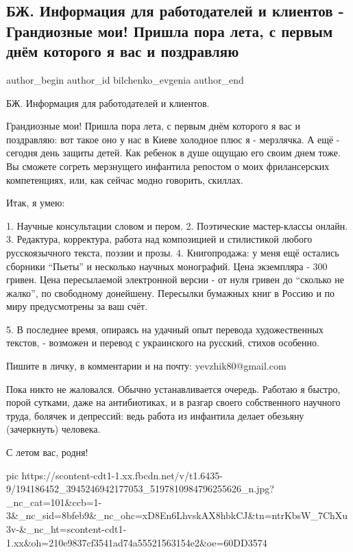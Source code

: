  
 
 
 
 
 
\subsection{БЖ. Информация для работодателей и клиентов - Грандиозные мои! Пришла пора лета, с первым днём которого я вас и поздравляю}
\label{sec:01_06_2021.fb.bilchenko_evgenia.1.leto_kiev_holod_pozdravlenie_rabota}
\ifcmt
 author_begin
   author_id bilchenko_evgenia
 author_end
\fi

БЖ. Информация для работодателей и клиентов.

Грандиозные мои! Пришла пора лета, с первым днём которого я вас и поздравляю:
вот такое оно у нас в Киеве холодное плюс я - мерзлячка. А ещё - сегодня день
защиты детей. Как ребенок в душе ощущаю его своим днем тоже. Вы сможете согреть
мерзнущего инфантила репостом о моих фрилансерских компетенциях, или, как
сейчас модно говорить, скиллах.

Итак, я умею:

1. Научные консультации словом и пером.
2. Поэтические мастер-классы онлайн.
3. Редактура, корректура, работа над композицией и стилистикой любого русскоязычного текста, поэзии и прозы.
4. Книгопродажа: у меня ещё остались сборники \enquote{Пьеты} и несколько научных
монографий. Цена экземпляра - 300 гривен. Цена пересылаемой электронной версии
- от нуля гривен до \enquote{сколько не жалко}, по свободному донейшену. Пересылки
бумажных книг в Россию и по миру предусмотрены за ваш счёт.

5. В последнее время, опираясь на удачный опыт перевода художественных текстов, - возможен и перевод с украинского на русский, стихов особенно.

Пишите в личку, в комментарии и на почту: yevzhik80@gmail.com

Пока никто не жаловался. Обычно устанавливается очередь. Работаю я быстро,
порой сутками, даже на антибиотиках, и в разгар своего собственного научного
труда, болячек и депрессий: ведь работа из инфантила делает обезьяну
(зачеркнуть) человека.

С летом вас, родня!

\ifcmt
  pic https://scontent-cdt1-1.xx.fbcdn.net/v/t1.6435-9/194186452_3945246942177053_5197810984796255626_n.jpg?_nc_cat=101&ccb=1-3&_nc_sid=8bfeb9&_nc_ohc=xD8En6LhvskAX8hbkCJ&tn=ntrKbsW_7ChXu3v-&_nc_ht=scontent-cdt1-1.xx&oh=210e9837cf3541ad74a55521563154e2&oe=60DD3574
\fi

